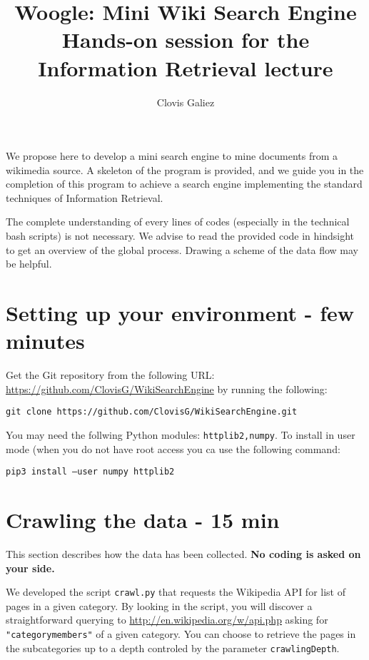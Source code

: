 \documentclass[mathserif, 11pt,c]{article}
\title{Woogle: Mini Wiki Search Engine\\
\Large Hands-on session for the Information Retrieval lecture}
\author{Clovis Galiez}
\begin{document}
\setcounter{secnumdepth}{1} 

\newcommand{\normtwo}[1]{\left|\left|#1\right|\right|_2} 
\newcommand{\normmat}[1]{\left|\left|\left|#1\right|\right|\right|} 
\newcommand{\n}[1]{\lVert #1 \rVert} 
\newcommand{\myd}[2]{ 2\log{\dfrac{\n{#1}.\n{#2}}{#1\cdot #2}}}

\maketitle


We propose here to develop a mini search engine to mine documents from a wikimedia source. A skeleton of the program is provided, and we guide you in the completion of this program to achieve a search engine implementing the standard techniques of Information Retrieval.

The complete understanding of every lines of codes (especially in the technical bash scripts) is not necessary. We advise to read the provided code in hindsight to get an overview of the global process. Drawing a scheme of the data flow may be helpful.



\section{Setting up your environment - few minutes}

Get the Git repository from the following URL: \url{https://github.com/ClovisG/WikiSearchEngine} by running the following:

\texttt{git clone https://github.com/ClovisG/WikiSearchEngine.git}

You may need the follwing Python modules: \texttt{httplib2,numpy}. To install in user mode (when you do not have root access you ca use the following command:

\texttt{pip3 install --user numpy httplib2}

\section{Crawling the data - 15 min}



This section describes how the data has been collected. \textbf{No coding is asked on your side.}

We developed the script \texttt{crawl.py} that requests the Wikipedia API for list of pages in a given category. By looking in the script, you will discover a straightforward querying to \url{http://en.wikipedia.org/w/api.php} asking for \texttt{"categorymembers"} of a given category. You can choose to retrieve the pages in the subcategories up to a depth controled by the parameter \texttt{crawlingDepth}.
\end{document}
